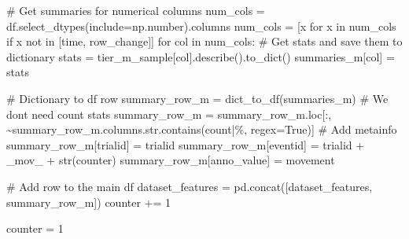 \documentclass[
  letterpaper,
  DIV=11,
  numbers=noendperiod]{scrreprt}
\newenvironment{Shaded}{\begin{snugshade}}{\end{snugshade}}
\newcommand{\BuiltInTok}[1]{\textcolor[rgb]{0.00,0.23,0.31}{#1}}
\newcommand{\CommentTok}[1]{\textcolor[rgb]{0.37,0.37,0.37}{#1}}
\newcommand{\ControlFlowTok}[1]{\textcolor[rgb]{0.00,0.23,0.31}{#1}}
\newcommand{\DecValTok}[1]{\textcolor[rgb]{0.68,0.00,0.00}{#1}}
\newcommand{\KeywordTok}[1]{\textcolor[rgb]{0.00,0.23,0.31}{#1}}
\newcommand{\NormalTok}[1]{\textcolor[rgb]{0.00,0.23,0.31}{#1}}
\newcommand{\OperatorTok}[1]{\textcolor[rgb]{0.37,0.37,0.37}{#1}}
\newcommand{\StringTok}[1]{\textcolor[rgb]{0.13,0.47,0.30}{#1}}
\newcommand{\VariableTok}[1]{\textcolor[rgb]{0.07,0.07,0.07}{#1}}
\begin{document}
\begin{Shaded}
\begin{Highlighting}[]
                \CommentTok{\# Get summaries for numerical columns}
\NormalTok{                num\_cols }\OperatorTok{=}\NormalTok{ df.select\_dtypes(include}\OperatorTok{=}\NormalTok{np.number).columns}
\NormalTok{                num\_cols }\OperatorTok{=}\NormalTok{ [x }\ControlFlowTok{for}\NormalTok{ x }\KeywordTok{in}\NormalTok{ num\_cols }\ControlFlowTok{if}\NormalTok{ x }\KeywordTok{not} \KeywordTok{in}\NormalTok{ [}\StringTok{\textquotesingle{}time\textquotesingle{}}\NormalTok{, }\StringTok{\textquotesingle{}row\_change\textquotesingle{}}\NormalTok{]]}
                \ControlFlowTok{for}\NormalTok{ col }\KeywordTok{in}\NormalTok{ num\_cols:}
                    \CommentTok{\# Get stats and save them to dictionary}
\NormalTok{                    stats }\OperatorTok{=}\NormalTok{ tier\_m\_sample[col].describe().to\_dict()}
\NormalTok{                    summaries\_m[col] }\OperatorTok{=}\NormalTok{ stats}

                \CommentTok{\# Dictionary to df row}
\NormalTok{                summary\_row\_m }\OperatorTok{=}\NormalTok{ dict\_to\_df(summaries\_m)}
                \CommentTok{\# We don\textquotesingle{}t need count stats}
\NormalTok{                summary\_row\_m }\OperatorTok{=}\NormalTok{ summary\_row\_m.loc[:, }\OperatorTok{\textasciitilde{}}\NormalTok{summary\_row\_m.columns.}\BuiltInTok{str}\NormalTok{.contains(}\StringTok{\textquotesingle{}count|\%\textquotesingle{}}\NormalTok{, regex}\OperatorTok{=}\VariableTok{True}\NormalTok{)]}
                \CommentTok{\# Add metainfo}
\NormalTok{                summary\_row\_m[}\StringTok{\textquotesingle{}trialid\textquotesingle{}}\NormalTok{] }\OperatorTok{=}\NormalTok{ trialid}
\NormalTok{                summary\_row\_m[}\StringTok{\textquotesingle{}eventid\textquotesingle{}}\NormalTok{] }\OperatorTok{=}\NormalTok{ trialid }\OperatorTok{+} \StringTok{\textquotesingle{}\_mov\_\textquotesingle{}} \OperatorTok{+} \BuiltInTok{str}\NormalTok{(counter)}
\NormalTok{                summary\_row\_m[}\StringTok{\textquotesingle{}anno\_value\textquotesingle{}}\NormalTok{] }\OperatorTok{=} \StringTok{\textquotesingle{}movement\textquotesingle{}}

                \CommentTok{\# Add row to the main df}
\NormalTok{                dataset\_features }\OperatorTok{=}\NormalTok{ pd.concat([dataset\_features, summary\_row\_m])}
\NormalTok{                counter }\OperatorTok{+=} \DecValTok{1}
            
\NormalTok{        counter }\OperatorTok{=} \DecValTok{1}


\end{Highlighting}
\end{Shaded}
\end{document}

